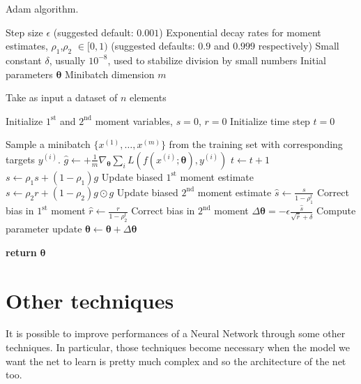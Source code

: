 \begin{algorithm}[H]
\caption{Adam algorithm.}\label{alg:ADAM}
\begin{algorithmic}[1]
\Require Step size $\epsilon$ (suggested default: $0.001$)
\Require Exponential decay rates for moment estimates, $\rho_1$,$\rho_2$ $\in [0,1)$ (suggested defaults: $0.9$ and $0.999$ respectively)
\Require Small constant $\delta$, usually $10^{-8}$, used to stabilize division by small numbers
\Require Initial parameters $\bm{\theta}$
\Require Minibatch dimension $m$

 \Comment Take as input a dataset of $n$ elements

\State Initialize $1^\text{st}$ and $2^\text{nd}$ moment variables, $s=0$, $r=0$
\State Initialize time step $t=0$

\State Sample a minibatch $\{x^{(1)},\dots,x^{(m)}\}$ from the training set with corresponding targets $y^{(i)}$.
\State $\hat{g} \gets + \frac{1}{m} \nabla_{\bm{\theta}} \sum_{i} L(f(x^{(i)};\mathbf{\theta}), y^{(i)})$ 
\State $t \gets t+1$
\State $s \gets \rho_1 s + (1-\rho_1) g$    \Comment Update biased $1^\text{st}$ moment estimate
\State $s \gets \rho_2 r + (1-\rho_2) g \odot g$    \Comment Update biased $2^\text{nd}$ moment estimate
\State $\hat{s} \gets \frac{s}{1 - \rho^t_1}$   \Comment Correct bias in $1^\text{st}$ moment
\State $\hat{r} \gets \frac{r}{1 - \rho^t_2}$   \Comment Correct bias in $2^\text{nd}$ moment
\State $\Delta \bm{\theta} = - \epsilon \frac{\hat{s}}{\sqrt{\hat{r}} + \delta}$ \Comment Compute parameter update
\State $\bm{\theta} \gets \bm{\theta} + \Delta \bm{\theta}$
\EndWhile

\State \textbf{return} $\bm{\theta}$
\EndProcedure
\end{algorithmic}
\end{algorithm}





\section{Other techniques}
It is possible to improve performances of a Neural Network through some other techniques. In particular, those techniques become necessary when the model we want the net to learn is pretty much complex and so the architecture of the net too.



